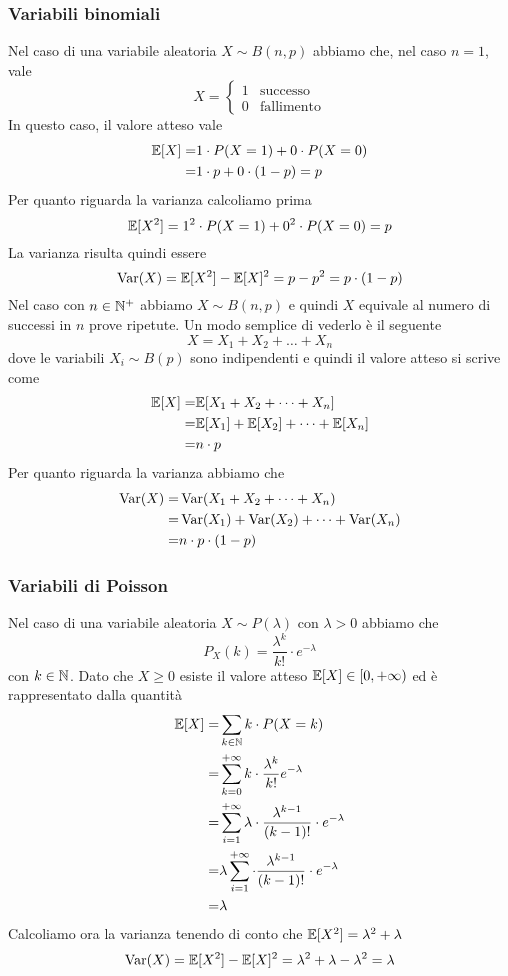 \subsubsection{Variabili binomiali}
Nel caso di una variabile aleatoria $X \sim B(n,p)$ abbiamo che, nel caso $n=1$, vale
\[
	X = \begin{cases}
		1 & \text{successo}   \\
		0 & \text{fallimento}
	\end{cases}
\]
In questo caso, il valore atteso vale
\begin{align*}
	\mathbb{E}[X] = & 1 \cdot P(X = 1) + 0 \cdot P(X = 0) \\
	=       & 1 \cdot p + 0 \cdot (1-p) = p
\end{align*}
Per quanto riguarda la varianza calcoliamo prima
\[ \mathbb{E}[X^2] = 1^2 \cdot P(X=1) + 0^2 \cdot P(X = 0) = p \]
La varianza risulta quindi essere
\[ \operatorname{Var}(X) = \mathbb{E}[X^2] - \mathbb{E}[X]^2 = p - p^2 = p \cdot (1-p) \]
Nel caso con $n \in \mathbb{N}^+$ abbiamo $X \sim B(n,p)$ e quindi $X$ equivale al numero di successi in
$n$ prove ripetute. Un modo semplice di vederlo è il seguente
\[ X = X_1 + X_2 + \dots + X_n \]
dove le variabili $X_i \sim B(p)$ sono indipendenti e quindi il valore atteso si scrive come
\begin{align*}
	\mathbb{E}[X] = & \mathbb{E}[X_1 + X_2 + \dots + X_n]         \\
	=       & \mathbb{E}[X_1] + \mathbb{E}[X_2] + \dots + \mathbb{E}[X_n] \\
	=       & n \cdot p
\end{align*}
Per quanto riguarda la varianza abbiamo che
\begin{align*}
	\operatorname{Var}(X) = & \operatorname{Var}(X_1 + X_2 + \dots + X_n)             \\
	=         & \operatorname{Var}(X_1) + \operatorname{Var}(X_2) + \dots + \operatorname{Var}(X_n) \\
	=         & n \cdot p \cdot (1-p)
\end{align*}

\subsubsection{Variabili di Poisson}
Nel caso di una variabile aleatoria $X \sim P(\lambda)$ con $\lambda > 0$ abbiamo che
\[ P_X (k) = \frac{\lambda^k}{k!} \cdot e^{-\lambda} \]
con $k \in \mathbb{N}$. Dato che $X \geq 0$ esiste il valore atteso $\mathbb{E}[X] \in [0, +\infty)$ ed è
rappresentato dalla quantità
\begin{align*}
	\mathbb{E}[X] = & \sum_{k \in \mathbb{N}} k \cdot P(X = k)                                                   \\
	=       & \sum_{k=0}^{+\infty} k \cdot \frac{\lambda^k}{k!} e^{-\lambda}                     \\
	=       & \sum_{i=1}^{+\infty} \lambda \cdot \frac{\lambda^{k-1}}{(k-1)!} \cdot e^{-\lambda} \\
	=       & \lambda \sum_{i=1}^{+\infty} \cdot \frac{\lambda^{k-1}}{(k-1)!} \cdot e^{-\lambda} \\
	=       & \lambda
\end{align*}
Calcoliamo ora la varianza tenendo di conto che $\mathbb{E}[X^2] = \lambda^2 + \lambda$
\[ \operatorname{Var}(X) = \mathbb{E}[X^2] - \mathbb{E}[X]^2 = \lambda^2 + \lambda - \lambda^2 = \lambda \]

